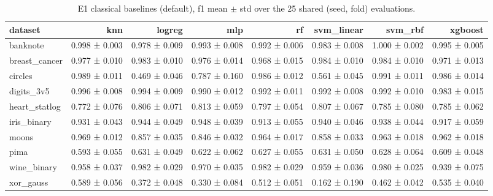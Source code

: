 \begin{table}[ht]
\centering
\caption{E1 classical baselines (default), f1 mean $\pm$ std over the 25 shared (seed, fold) evaluations.}
\label{tab:e1-default-f1}
\begin{tabular}{lrrrrrrr}
\toprule
dataset & knn & logreg & mlp & rf & svm\_linear & svm\_rbf & xgboost \\
\midrule
banknote & 0.998 ± 0.003 & 0.978 ± 0.009 & 0.993 ± 0.008 & 0.992 ± 0.006 & 0.983 ± 0.008 & 1.000 ± 0.002 & 0.995 ± 0.005 \\
breast\_cancer & 0.977 ± 0.010 & 0.983 ± 0.010 & 0.976 ± 0.014 & 0.968 ± 0.015 & 0.984 ± 0.010 & 0.984 ± 0.010 & 0.971 ± 0.013 \\
circles & 0.989 ± 0.011 & 0.469 ± 0.046 & 0.787 ± 0.160 & 0.986 ± 0.012 & 0.561 ± 0.045 & 0.991 ± 0.011 & 0.986 ± 0.014 \\
digits\_3v5 & 0.996 ± 0.008 & 0.994 ± 0.009 & 0.990 ± 0.012 & 0.992 ± 0.011 & 0.992 ± 0.008 & 0.992 ± 0.010 & 0.983 ± 0.015 \\
heart\_statlog & 0.772 ± 0.076 & 0.806 ± 0.071 & 0.813 ± 0.059 & 0.797 ± 0.054 & 0.807 ± 0.067 & 0.785 ± 0.080 & 0.785 ± 0.062 \\
iris\_binary & 0.931 ± 0.043 & 0.944 ± 0.049 & 0.948 ± 0.039 & 0.913 ± 0.055 & 0.940 ± 0.046 & 0.938 ± 0.044 & 0.917 ± 0.059 \\
moons & 0.969 ± 0.012 & 0.857 ± 0.035 & 0.846 ± 0.032 & 0.964 ± 0.017 & 0.858 ± 0.033 & 0.963 ± 0.018 & 0.962 ± 0.018 \\
pima & 0.593 ± 0.055 & 0.631 ± 0.049 & 0.622 ± 0.062 & 0.627 ± 0.055 & 0.631 ± 0.050 & 0.628 ± 0.064 & 0.609 ± 0.048 \\
wine\_binary & 0.958 ± 0.037 & 0.982 ± 0.029 & 0.970 ± 0.035 & 0.982 ± 0.029 & 0.959 ± 0.036 & 0.980 ± 0.025 & 0.939 ± 0.075 \\
xor\_gauss & 0.589 ± 0.056 & 0.372 ± 0.048 & 0.330 ± 0.084 & 0.512 ± 0.051 & 0.162 ± 0.190 & 0.462 ± 0.042 & 0.535 ± 0.040 \\
\bottomrule
\end{tabular}
\end{table}
